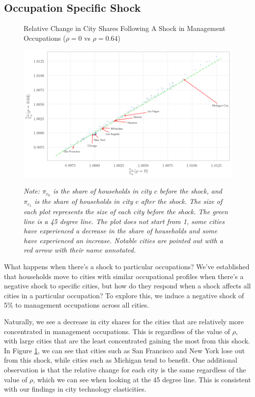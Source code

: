 \documentclass[10pt]{article}
\begin{document}
\subsection{Occupation Specific Shock}

\begin{figure}[!htb]
    \centering
    \caption{Relative Change in City Shares Following A Shock in Management Occupations ($\rho = 0$ vs $\rho = 0.64$)}
    \includegraphics[width=\textwidth]{../../estimations/graphs/occ_shock.png}
    \label{man_change_graph}
    \caption*{\small\textit{Note: $\pi_{c_0}$ is the share of households in city $c$ before the shock, and $\pi_{c_1}$ is the share of households in city $c$ after the shock. The size of each plot represents the size of each city before the shock. The green line is a 45 degree line. The plot does not start from 1, some cities have experienced a decrease in the share of households and some have experienced an increase. Notable cities are pointed out with a red arrow with their name annotated.}}
\end{figure}

What happens when there's a shock to particular occupations? We've established that households move to cities with similar occupational profiles when there's a negative shock to specific cities, but how do they respond when a shock affects all cities in a particular occupation? To explore this, we induce a negative shock of 5\% to management occupations across all cities.

Naturally, we see a decrease in city shares for the cities that are relatively more concentrated in management occupations. This is regardless of the value of $\rho$, with large cities that are the least concentrated gaining the most from this shock. In Figure \ref{man_change_graph}, we can see that cities such as San Francisco and New York lose out from this shock, while cities such as Michigan tend to benefit. One additional observation is that the relative change for each city is the same regardless of the value of $\rho$, which we can see when looking at the 45 degree line. This is consistent with our findings in city technology elasticities.
\end{document}
